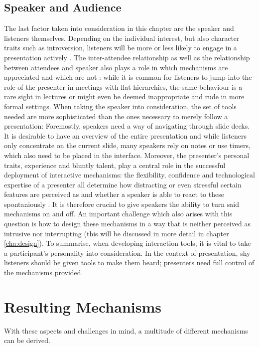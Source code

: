 \subsection{Speaker and Audience}
The last factor taken into consideration in this chapter are the speaker and listeners themselves. Depending on the individual interest, but also character traits such as introversion, listeners will be more or less likely to engage in a presentation actively \cite{Bry:Backstage}. The inter-attendee relationship as well as the relationship between attendees and speaker also plays a role in which mechanisms are appreciated and which are not \cite{Moore:ThreeTypesOfInteraction}: while it is common for listeners to jump into the role of the presenter in meetings with flat-hierarchies, the same behaviour is a rare sight in lectures or might even be deemed inappropriate and rude in more formal settings. When taking the speaker into consideration, the set of tools needed are more sophisticated than the ones necessary to merely follow a presentation: Foremostly, speakers need a way of navigating through slide decks. It is desirable to have an overview of the entire presentation and while listeners only concentrate on the current slide, many speakers rely on notes or use timers, which also need to be placed in the interface.
Moreover, the presenter's personal traits, experience and bluntly talent, play a central role in the successful deployment of interactive mechanisms: the flexibility, confidence and technological expertise of a presenter all determine how distracting or even stressful certain features are perceived as and whether a speaker is able to react to these spontaniously \cite{Wacker:PresenterExperience}. It is therefore crucial to give speakers the ability to turn said mechanisms on and off. An important challenge which also arises with this question is how to design these mechanisms in a way that is neither perceived as intrusive nor interrupting (this will be discussed in more detail in chapter \ref{cha:design}).
To summarise, when developing interaction tools, it is vital to take a participant's personality into consideration. In the context of presentation, shy listeners should be given tools to make them heard; presenters need full control of the mechanisms provided.

\section{Resulting Mechanisms}
With these aspects and challenges in mind, a multitude of different mechanisms can be derived. 

